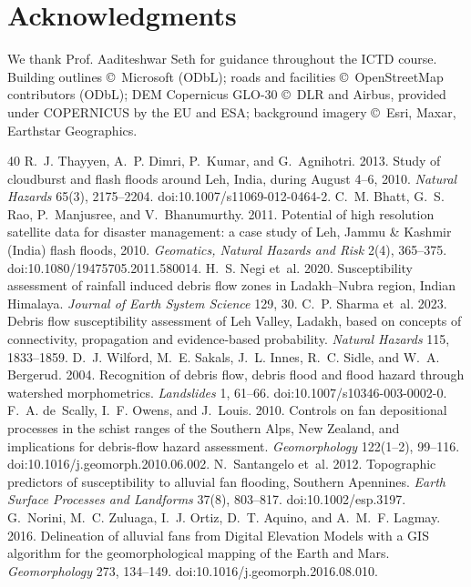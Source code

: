 \documentclass[sigconf,nonacm]{acmart}
\newenvironment{acks}{\section*{Acknowledgments}}{}
\begin{document}
\begin{acks}
We thank Prof. Aaditeshwar Seth for guidance throughout the ICTD course. Building outlines \copyright\ Microsoft (ODbL); roads and facilities \copyright\ OpenStreetMap contributors (ODbL); DEM Copernicus GLO-30 \copyright\ DLR and Airbus, provided under COPERNICUS by the EU and ESA; background imagery \copyright\ Esri, Maxar, Earthstar Geographics.
\end{acks}

\begin{thebibliography}{40}
 R.~J. Thayyen, A.~P. Dimri, P.~Kumar, and G.~Agnihotri. 2013. Study of cloudburst and flash floods around Leh, India, during August 4--6, 2010. \emph{Natural Hazards} 65(3), 2175--2204. doi:10.1007/s11069-012-0464-2.
 C.~M. Bhatt, G.~S. Rao, P.~Manjusree, and V.~Bhanumurthy. 2011. Potential of high resolution satellite data for disaster management: a case study of Leh, Jammu \& Kashmir (India) flash floods, 2010. \emph{Geomatics, Natural Hazards and Risk} 2(4), 365--375. doi:10.1080/19475705.2011.580014.
 H.~S. Negi et~al. 2020. Susceptibility assessment of rainfall induced debris flow zones in Ladakh--Nubra region, Indian Himalaya. \emph{Journal of Earth System Science} 129, 30.
 C.~P. Sharma et~al. 2023. Debris flow susceptibility assessment of Leh Valley, Ladakh, based on concepts of connectivity, propagation and evidence-based probability. \emph{Natural Hazards} 115, 1833--1859.
 D.~J. Wilford, M.~E. Sakals, J.~L. Innes, R.~C. Sidle, and W.~A. Bergerud. 2004. Recognition of debris flow, debris flood and flood hazard through watershed morphometrics. \emph{Landslides} 1, 61--66. doi:10.1007/s10346-003-0002-0.
 F.~A. de~Scally, I.~F. Owens, and J.~Louis. 2010. Controls on fan depositional processes in the schist ranges of the Southern Alps, New Zealand, and implications for debris-flow hazard assessment. \emph{Geomorphology} 122(1--2), 99--116. doi:10.1016/j.geomorph.2010.06.002.
 N.~Santangelo et~al. 2012. Topographic predictors of susceptibility to alluvial fan flooding, Southern Apennines. \emph{Earth Surface Processes and Landforms} 37(8), 803--817. doi:10.1002/esp.3197.
 G.~Norini, M.~C. Zuluaga, I.~J. Ortiz, D.~T. Aquino, and A.~M.~F. Lagmay. 2016. Delineation of alluvial fans from Digital Elevation Models with a GIS algorithm for the geomorphological mapping of the Earth and Mars. \emph{Geomorphology} 273, 134--149. doi:10.1016/j.geomorph.2016.08.010.

\end{thebibliography}
\end{document}
